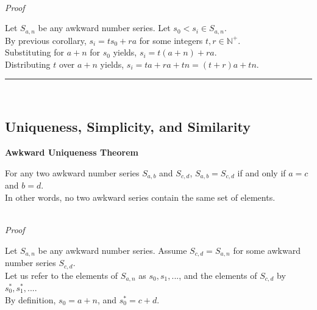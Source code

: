 \documentclass[a4paper,12pt]{article}
\begin{document}
\noindent \\
\textit{Proof}

\noindent Let $S_{a,n}$ be any awkward number series. Let $s_0 < s_i \in S_{a, n}$.\\

\noindent By previous corollary, $s_i = ts_0 + ra$ for some integers $t, r \in \mathbb{N}^+$.\\

\noindent Substituting for $a + n$ for $s_0$ yields, $s_i = t(a + n) + ra$.\\

\noindent Distributing $t$ over $a + n$ yields, $s_i = ta + ra + tn = (t + r)a + tn$.

\begin{center}
\noindent\rule{8cm}{0.4pt}
\end{center}
\noindent \\





\subsection{Uniqueness, Simplicity, and Similarity}



\label{theorem:awkward_uniqueness}
\hypertarget{theorem:awkward_uniqueness}{}
\begin{tcolorbox}
\textbf{Awkward Uniqueness Theorem}

\noindent For any two awkward number series $S_{a,b}$ and $S_{c,d}$, $S_{a,b} = S_{c,d}$ if and only if $a = c$ and $b = d$.\\

\noindent In other words, no two awkward series contain the same set of elements.
\end{tcolorbox}

\noindent \\
\textit{Proof}

\noindent Let $S_{a,n}$ be any awkward number series. Assume $S_{c, d} = S_{a, n}$ for some awkward number series $S_{c,d}$.\\


\noindent Let us refer to the elements of $S_{a,n}$ as $s_0, s_1, ...$, and the elements of $S_{c,d}$ by $s^*_0, s^*_1, ...$.\\

\noindent By definition, $s_0 = a + n$, and $s^*_0 = c + d$.\\
\end{document}
